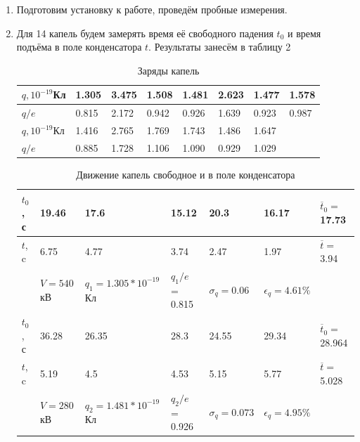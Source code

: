 \documentclass[a4paper]{article}
\begin{document}
\begin{enumerate}
    \item Подготовим установку к работе, проведём пробные измерения. 
    \item Для 14 капель будем замерять время её свободного падения $t_0$ и время подъёма в поле конденсатора $t$. Результаты занесём в таблицу 2
    
    \begin{table}[h]
    \centering
    \begin{center}
    \caption{Заряды капель}
    \end{center}
    \vspace{0.1cm}
    \label{tab:my_label}
    \begin{tabular}{ |p{2cm}||p{1.2cm}|p{1.2cm}|p{1.2cm}|p{}|p{1.2cm}|p{1.2cm}|p{1.2cm}| }
 \hline
    $q, 10^{-19}$Кл & 1.305 & 3.475 & 1.508 & 1.481 & 2.623 & 1.477 & 1.578 \\
\hline
    $q/e$ & 0.815 & 2.172 & 0.942 & 0.926 & 1.639 & 0.923 & 0.987\\
     
\hline
 \hline
    $q, 10^{-19}$Кл & 1.416 & 2.765 & 1.769 & 1.743 & 1.486 & 1.647 &  \\
\hline
    $q/e$ & 0.885 & 1.728 & 1.106 & 1.090 & 0.929 & 1.029 & \\

     
\hline
\hline
    

    \end{tabular}
\end{table}
    
      \begin{table}[h]
    \centering
    \begin{center}
    \caption{Движение капель свободное и в поле конденсатора}
    \end{center}
    \vspace{0.1cm}
    \label{tab:my_label}
    \begin{tabular}{ |p{1cm}||p{2cm}|p{3cm}|p{2cm}|p{1.8cm}|p{2cm}|p{1.8cm}| }
 \hline
    $t_0$, с & 19.46 & 17.6 & 15.12 & 20.3 & 16.17 & $\overline t_0 = $17.73 \\
\hline
    $t$, c & 6.75 & 4.77 & 3.74 & 2.47 & 1.97 & $\overline t = $3.94\\
\hline
     & $V = 540$ кВ & $q_1 = 1.305*10^{-19}$ Кл & $q_1/e$ = 0.815 & $\sigma_q = 0.06$ & $\epsilon_q = 4.61 \%$ &  \\
     
\hline
 \hline
    $t_0$, с & 36.28 & 26.35 & 28.3 & 24.55 & 29.34& $\overline t_0 = $28.964 \\
\hline
    $t$, c & 5.19 & 4.5 & 4.53 & 5.15 & 5.77 & $\overline t = $5.028\\
\hline
     & $V = 280$ кВ & $q_2 = 1.481*10^{-19}$ Кл & $q_2/e$ = 0.926 & $\sigma_q = 0.073$ & $\epsilon_q = 4.95 \%$ &  \\
     

\end{tabular}
\end{table}
\end{enumerate}
\end{document}
